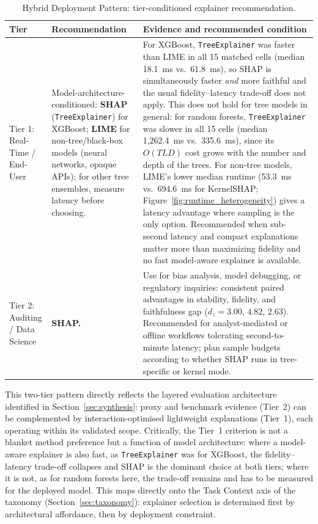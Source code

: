 \documentclass[fleqn,10pt,lineno]{wlpeerj}
\begin{document}
\begin{table}[h]
\centering
\caption{Hybrid Deployment Pattern: tier-conditioned explainer recommendation.}
\label{tab:hybrid_deployment}
\begin{tabularx}{\linewidth}{p{2.0cm} >{\raggedright\arraybackslash}p{3.0cm} X}
\toprule
\textbf{Tier} & \textbf{Recommendation} & \textbf{Evidence and recommended condition} \\
\midrule
Tier 1: Real-Time / End-User &
Model-architecture-conditioned: \textbf{SHAP} (\texttt{TreeExplainer}) for
XGBoost; \textbf{LIME} for non-tree/black-box models (neural networks,
opaque APIs); for other tree ensembles, measure latency before choosing. &
For XGBoost, \texttt{TreeExplainer} was faster than LIME in all 15 matched
cells (median 18.1~ms vs.\ 61.8~ms), so SHAP is simultaneously faster
\emph{and} more faithful and the usual fidelity--latency trade-off does
not apply. This does not hold for tree models in general: for random
forests, \texttt{TreeExplainer} was slower in all 15 cells (median
1,262.4~ms vs.\ 335.6~ms), since its $O(TLD)$ cost grows with the number
and depth of the trees. For non-tree
models, LIME's lower median runtime (53.3~ms vs.\ 694.6~ms for
KernelSHAP; Figure~\ref{fig:runtime_heterogeneity}) gives a latency
advantage where sampling is the only option. Recommended when sub-second
latency and compact explanations matter more than maximizing fidelity
and no fast model-aware explainer is available. \\[6pt]
Tier 2: Auditing / Data Science &
\textbf{SHAP.} &
Use for bias analysis, model debugging, or regulatory inquiries: consistent
paired advantages in stability, fidelity, and faithfulness gap ($d_z =
3.00$, $4.82$, $2.63$). Recommended for analyst-mediated or offline
workflows tolerating second-to-minute latency; plan sample budgets
according to whether SHAP runs in tree-specific or kernel mode. \\
\bottomrule
\end{tabularx}
\end{table}

This two-tier pattern directly reflects the layered evaluation
architecture identified in Section~\ref{sec:synthesis}: proxy and
benchmark evidence (Tier~2) can be complemented by interaction-optimised
lightweight explanations (Tier~1), each operating within its validated
scope.  Critically, the Tier~1 criterion is not a blanket method preference
but a function of model architecture: where a model-aware explainer is
also fast, as \texttt{TreeExplainer} was for XGBoost, the fidelity--latency
trade-off collapses and SHAP is the dominant choice at both tiers; where it
is not, as for random forests here, the trade-off remains and has to be
measured for the deployed model.  This maps directly onto the Task Context axis of the taxonomy
(Section~\ref{sec:taxonomy}): explainer selection is determined first by
architectural affordance, then by deployment constraint.
\end{document}
